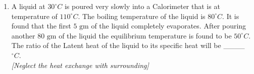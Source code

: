 
\begin{enumerate}
    \item A liquid at \(30^\circ C\) is poured very slowly into a Calorimeter that is at temperature of \(110^\circ C\). The boiling temperature of the liquid is \(80^\circ C\). It is found that the first \(5 \text{ gm}\) of the liquid completely evaporates. After pouring another \(80 \text{ gm}\) of the liquid the equilibrium temperature is found to be \(50^\circ C\). The ratio of the Latent heat of the liquid to its specific heat will be \_\_\_\_ \(^\circ C\).
    \\\emph{[Neglect the heat exchange with surrounding]}
\end{enumerate}
